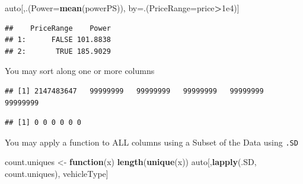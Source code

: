 \documentclass[]{book}
\newenvironment{Shaded}{\begin{snugshade}}{\end{snugshade}}
\newcommand{\KeywordTok}[1]{\textcolor[rgb]{0.13,0.29,0.53}{\textbf{#1}}}
\newcommand{\DataTypeTok}[1]{\textcolor[rgb]{0.13,0.29,0.53}{#1}}
\newcommand{\FloatTok}[1]{\textcolor[rgb]{0.00,0.00,0.81}{#1}}
\newcommand{\StringTok}[1]{\textcolor[rgb]{0.31,0.60,0.02}{#1}}
\newcommand{\CommentTok}[1]{\textcolor[rgb]{0.56,0.35,0.01}{\textit{#1}}}
\newcommand{\ControlFlowTok}[1]{\textcolor[rgb]{0.13,0.29,0.53}{\textbf{#1}}}
\newcommand{\OperatorTok}[1]{\textcolor[rgb]{0.81,0.36,0.00}{\textbf{#1}}}
\newcommand{\NormalTok}[1]{#1}
\theoremstyle{definition}
\theoremstyle{definition}
\theoremstyle{definition}
\theoremstyle{remark}
\begin{document}
\begin{Shaded}
\begin{Highlighting}[]
\NormalTok{auto[,.(}\DataTypeTok{Power=}\KeywordTok{mean}\NormalTok{(powerPS)), by=.(}\DataTypeTok{PriceRange=}\NormalTok{price}\OperatorTok{>}\FloatTok{1e4}\NormalTok{)] }
\end{Highlighting}
\end{Shaded}

\begin{verbatim}
##    PriceRange    Power
## 1:      FALSE 101.8838
## 2:       TRUE 185.9029
\end{verbatim}

You may sort along one or more columns

\begin{Shaded}
\end{Shaded}

\begin{verbatim}
## [1] 2147483647   99999999   99999999   99999999   99999999   99999999
\end{verbatim}

\begin{Shaded}
\end{Shaded}

\begin{verbatim}
## [1] 0 0 0 0 0 0
\end{verbatim}

You may apply a function to ALL columns using a Subset of the Data using
\texttt{.SD}

\begin{Shaded}
\begin{Highlighting}[]
\NormalTok{count.uniques <-}\StringTok{ }\ControlFlowTok{function}\NormalTok{(x) }\KeywordTok{length}\NormalTok{(}\KeywordTok{unique}\NormalTok{(x))}
\NormalTok{auto[,}\KeywordTok{lapply}\NormalTok{(.SD, count.uniques), vehicleType]}
\end{Highlighting}
\end{Shaded}
\end{document}
